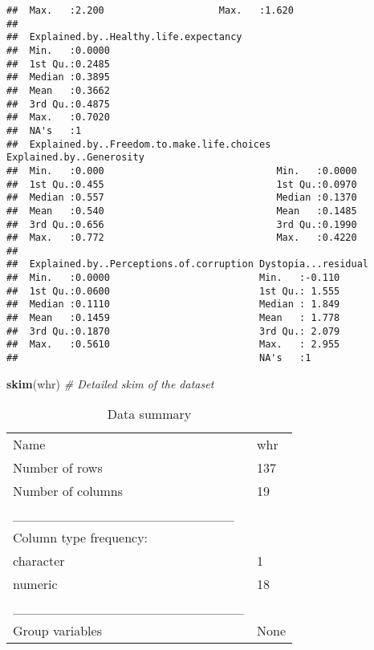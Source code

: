 \documentclass[
]{article}
\newenvironment{Shaded}{\begin{snugshade}}{\end{snugshade}}
\newcommand{\CommentTok}[1]{\textcolor[rgb]{0.56,0.35,0.01}{\textit{#1}}}
\newcommand{\FunctionTok}[1]{\textcolor[rgb]{0.13,0.29,0.53}{\textbf{#1}}}
\newcommand{\NormalTok}[1]{#1}
\begin{document}
\begin{verbatim}
##  Max.   :2.200                    Max.   :1.620               
##                                                               
##  Explained.by..Healthy.life.expectancy
##  Min.   :0.0000                       
##  1st Qu.:0.2485                       
##  Median :0.3895                       
##  Mean   :0.3662                       
##  3rd Qu.:0.4875                       
##  Max.   :0.7020                       
##  NA's   :1                            
##  Explained.by..Freedom.to.make.life.choices Explained.by..Generosity
##  Min.   :0.000                              Min.   :0.0000          
##  1st Qu.:0.455                              1st Qu.:0.0970          
##  Median :0.557                              Median :0.1370          
##  Mean   :0.540                              Mean   :0.1485          
##  3rd Qu.:0.656                              3rd Qu.:0.1990          
##  Max.   :0.772                              Max.   :0.4220          
##                                                                     
##  Explained.by..Perceptions.of.corruption Dystopia...residual
##  Min.   :0.0000                          Min.   :-0.110     
##  1st Qu.:0.0600                          1st Qu.: 1.555     
##  Median :0.1110                          Median : 1.849     
##  Mean   :0.1459                          Mean   : 1.778     
##  3rd Qu.:0.1870                          3rd Qu.: 2.079     
##  Max.   :0.5610                          Max.   : 2.955     
##                                          NA's   :1
\end{verbatim}

\begin{Shaded}
\begin{Highlighting}[]
\FunctionTok{skim}\NormalTok{(whr)  }\CommentTok{\# Detailed skim of the dataset}
\end{Highlighting}
\end{Shaded}

\begin{longtable}[]{@{}ll@{}}
\caption{Data summary}\tabularnewline
\toprule\noalign{}
\endfirsthead
\endhead
\bottomrule\noalign{}
\endlastfoot
Name & whr \\
Number of rows & 137 \\
Number of columns & 19 \\
\_\_\_\_\_\_\_\_\_\_\_\_\_\_\_\_\_\_\_\_\_\_\_ & \\
Column type frequency: & \\
character & 1 \\
numeric & 18 \\
\_\_\_\_\_\_\_\_\_\_\_\_\_\_\_\_\_\_\_\_\_\_\_\_ & \\
Group variables & None \\
\end{longtable}
\end{document}
